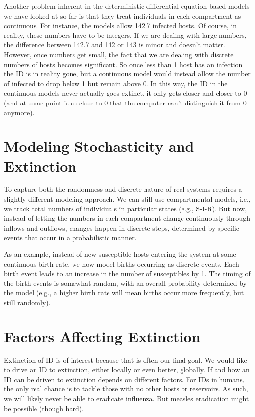 \documentclass[
]{book}
\begin{document}
Another problem inherent in the deterministic differential equation based models we have looked at so far is that they treat individuals in each compartment as continuous. For instance, the models allow 142.7 infected hosts. Of course, in reality, those numbers have to be integers. If we are dealing with large numbers, the difference between 142.7 and 142 or 143 is minor and doesn't matter. However, once numbers get small, the fact that we are dealing with discrete numbers of hosts becomes significant. So once less than 1 host has an infection the ID is in reality gone, but a continuous model would instead allow the number of infected to drop below 1 but remain above 0. In this way, the ID in the continuous models never actually goes extinct, it only gets closer and closer to 0 (and at some point is so close to 0 that the computer can't distinguish it from 0 anymore).

\hypertarget{modeling-stochasticity-and-extinction}{%
\section{Modeling Stochasticity and Extinction}\label{modeling-stochasticity-and-extinction}}

To capture both the randomness and discrete nature of real systems requires a slightly different modeling approach. We can still use compartmental models, i.e., we track total numbers of individuals in particular states (e.g., S-I-R). But now, instead of letting the numbers in each compartment change continuously through inflows and outflows, changes happen in discrete steps, determined by specific events that occur in a probabilistic manner.

As an example, instead of new susceptible hosts entering the system at some continuous birth rate, we now model births occurring as discrete events. Each birth event leads to an increase in the number of susceptibles by 1.
The timing of the birth events is somewhat random, with an overall probability determined by the model (e.g., a higher birth rate will mean births occur more frequently, but still randomly).

\hypertarget{factors-affecting-extinction}{%
\section{Factors Affecting Extinction}\label{factors-affecting-extinction}}

Extinction of ID is of interest because that is often our final goal. We would like to drive an ID to extinction, either locally or even better, globally. If and how an ID can be driven to extinction depends on different factors. For IDs in humans, the only real chance is to tackle those with no other hosts or reservoirs. As such, we will likely never be able to eradicate influenza. But measles eradication might be possible (though hard).
\end{document}
